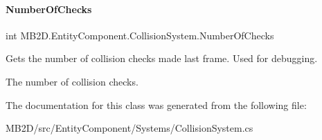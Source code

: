 \paragraph{\texorpdfstring{Number\+Of\+Checks}{NumberOfChecks}}
{\footnotesize\ttfamily int M\+B2\+D.\+Entity\+Component.\+Collision\+System.\+Number\+Of\+Checks\hspace{0.3cm}{\ttfamily [get]}}



Gets the number of collision checks made last frame. Used for debugging. 

The number of collision checks.

The documentation for this class was generated from the following file\+:\begin{DoxyCompactItemize}
\item 
M\+B2\+D/src/\+Entity\+Component/\+Systems/Collision\+System.\+cs\end{DoxyCompactItemize}
